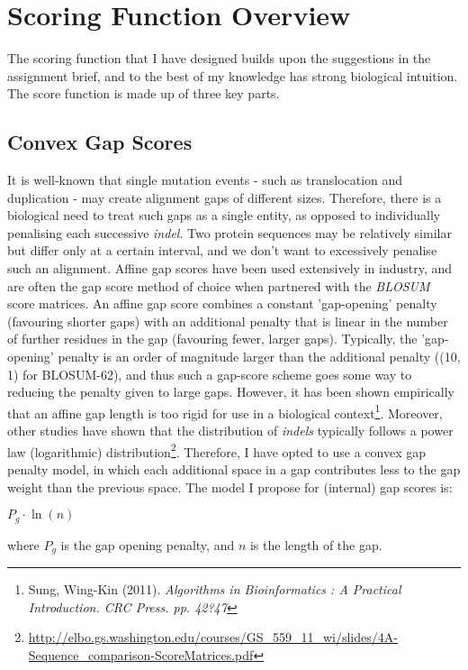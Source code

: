 \documentclass[a4paper]{article}
\begin{document}
\section{Scoring Function Overview}
The scoring function that I have designed builds upon the suggestions in the assignment brief, and to the best of my knowledge has strong biological intuition. The score function is made up of three key parts. 
\subsection{Convex Gap Scores}
It is well-known that single mutation events - such as translocation and duplication - may create alignment gaps of different sizes. Therefore, there is a biological need to treat such gaps as a single entity, as opposed to individually penalising each successive \textit{indel}. Two protein sequences may be relatively similar but differ only at a certain interval, and we don't want to excessively penalise such an alignment. Affine gap scores have been used extensively in industry, and are often the gap score method of choice when partnered with the \textit{BLOSUM} score matrices. An affine gap score combines a constant 'gap-opening' penalty (favouring shorter gaps) with an additional penalty that is linear in the number of further residues in the gap (favouring fewer, larger gaps). Typically, the 'gap-opening' penalty is an order of magnitude larger than the additional penalty ((10, 1) for BLOSUM-62), and thus such a gap-score scheme goes some way to reducing the penalty given to large gaps. However, it has been shown empirically that an affine gap length is too rigid for use in a biological context\footnote{Sung, Wing-Kin (2011). \textit{Algorithms in Bioinformatics : A Practical Introduction. CRC Press. pp. 42?47}}. Moreover, other studies have shown that the distribution of \textit{indels} typically follows a power law (logarithmic) distribution\footnote{\url{http://elbo.gs.washington.edu/courses/GS_559_11_wi/slides/4A-Sequence_comparison-ScoreMatrices.pdf}}. Therefore, I have opted to use a convex gap penalty model, in which each additional space in a gap contributes less to the gap weight than the previous space. The model I propose for (internal) gap scores is:
\begin{center}
$P_g \cdot \ln(n) $
\end {center}
where $P_g$ is the gap opening penalty, and $n$ is the length of the gap. 
\end{document}
